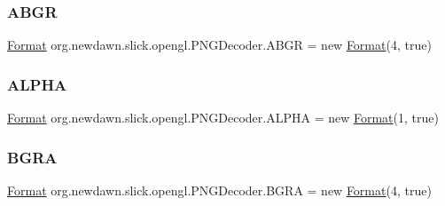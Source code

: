\subsubsection{\texorpdfstring{A\+B\+GR}{ABGR}}
{\footnotesize\ttfamily \mbox{\hyperlink{classorg_1_1newdawn_1_1slick_1_1opengl_1_1_p_n_g_decoder_1_1_format}{Format}} org.\+newdawn.\+slick.\+opengl.\+P\+N\+G\+Decoder.\+A\+B\+GR = new \mbox{\hyperlink{classorg_1_1newdawn_1_1slick_1_1opengl_1_1_p_n_g_decoder_1_1_format}{Format}}(4, true)\hspace{0.3cm}{\ttfamily [static]}}

\mbox{\label{classorg_1_1newdawn_1_1slick_1_1opengl_1_1_p_n_g_decoder_a2616963cd5d05e3a659cf81363629062}} 
\subsubsection{\texorpdfstring{A\+L\+P\+HA}{ALPHA}}
{\footnotesize\ttfamily \mbox{\hyperlink{classorg_1_1newdawn_1_1slick_1_1opengl_1_1_p_n_g_decoder_1_1_format}{Format}} org.\+newdawn.\+slick.\+opengl.\+P\+N\+G\+Decoder.\+A\+L\+P\+HA = new \mbox{\hyperlink{classorg_1_1newdawn_1_1slick_1_1opengl_1_1_p_n_g_decoder_1_1_format}{Format}}(1, true)\hspace{0.3cm}{\ttfamily [static]}}

\mbox{\label{classorg_1_1newdawn_1_1slick_1_1opengl_1_1_p_n_g_decoder_a306c7b9315ccc42ea3e8c73642de3dcc}} 
\subsubsection{\texorpdfstring{B\+G\+RA}{BGRA}}
{\footnotesize\ttfamily \mbox{\hyperlink{classorg_1_1newdawn_1_1slick_1_1opengl_1_1_p_n_g_decoder_1_1_format}{Format}} org.\+newdawn.\+slick.\+opengl.\+P\+N\+G\+Decoder.\+B\+G\+RA = new \mbox{\hyperlink{classorg_1_1newdawn_1_1slick_1_1opengl_1_1_p_n_g_decoder_1_1_format}{Format}}(4, true)\hspace{0.3cm}{\ttfamily [static]}}

